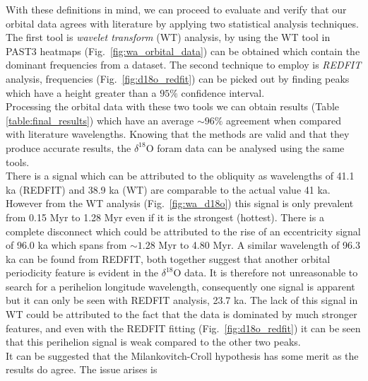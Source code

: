 \documentclass[12pt, onecolumn]{revtex4}    %
\begin{document}
With these definitions in mind, we can proceed to evaluate and verify that our orbital data agrees with literature by applying two statistical analysis techniques. The first tool is \textit{wavelet transform} (WT) analysis, by using the WT tool in PAST3 \cite{past3} heatmaps (Fig.~\ref{fig:wa_orbital_data}) can be obtained which contain the dominant frequencies from a dataset. The second technique to employ is \textit{REDFIT} analysis, frequencies (Fig.~\ref{fig:d18o_redfit}) can be picked out by finding peaks which have a height greater than a $95\%$ confidence interval. \\

Processing the orbital data with these two tools we can obtain results (Table \ref{table:final_results}) which have an average $\sim 96 \%$ agreement when compared with literature wavelengths. Knowing that the methods are valid and that they produce accurate results, the $\delta^{18}$O foram data can be analysed using the same tools. \\

There is a signal which can be attributed to the obliquity as wavelengths of 41.1 ka (REDFIT) and 38.9 ka (WT) are comparable to the actual value 41 ka. However from the WT analysis (Fig.~\ref{fig:wa_d18o}) this signal is only prevalent from 0.15 Myr to 1.28 Myr even if it is the strongest (hottest). There is a complete disconnect which could be attributed to the rise of an eccentricity signal of 96.0 ka which spans from $\sim 1.28$ Myr to 4.80 Myr. A similar wavelength of 96.3 ka can be found from REDFIT, both together suggest that another orbital periodicity feature is evident in the $\delta^{18}$O data. It is therefore not unreasonable to search for a perihelion longitude wavelength, consequently one signal is apparent but it can only be seen with REDFIT analysis, 23.7 ka. The lack of this signal in WT could be attributed to the fact that the data is dominated by much stronger features, and even with the REDFIT fitting (Fig.~\ref{fig:d18o_redfit}) it can be seen that this perihelion signal is weak compared to the other two peaks. \\

It can be suggested that the Milankovitch-Croll hypothesis has some merit as the results do agree. The issue arises is \\

\newpage




\end{document}
